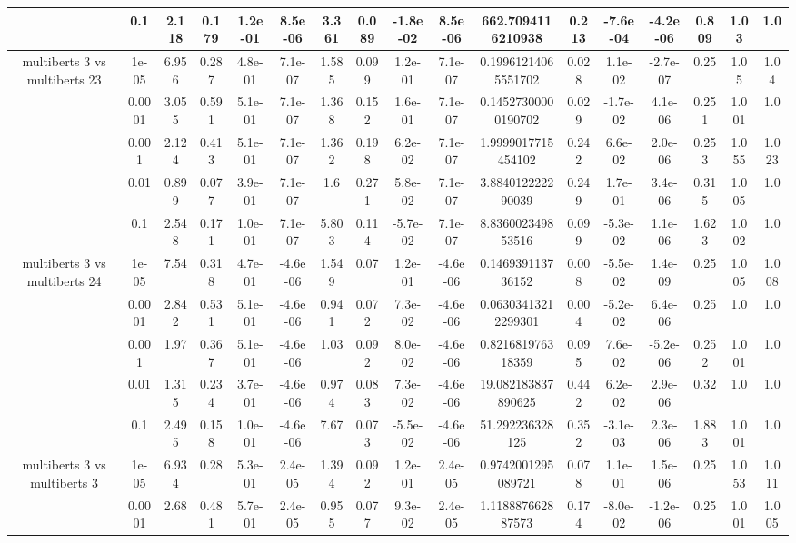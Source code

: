 \begin{tabular}{|c|c|c|c|c|c|c|c|c|c|c|c|c|c|c|c|c|}
 & 0.1 & 2.118 & 0.179 & 1.2e-01 & 8.5e-06 & 3.361 & 0.089 & -1.8e-02 & 8.5e-06 & 662.7094116210938 & 0.213 & -7.6e-04 & -4.2e-06 & 0.809 & 1.03 & 1.0 \\
\hline
\multirow{5}{*}{multiberts 3 vs multiberts 23} & 1e-05 & 6.956 & 0.287 & 4.8e-01 & 7.1e-07 & 1.585 & 0.099 & 1.2e-01 & 7.1e-07 & 0.19961214065551702 & 0.028 & 1.1e-02 & -2.7e-07 & 0.25 & 1.05 & 1.04 \\
 & 0.0001 & 3.055 & 0.591 & 5.1e-01 & 7.1e-07 & 1.368 & 0.152 & 1.6e-01 & 7.1e-07 & 0.14527300000190702 & 0.029 & -1.7e-02 & 4.1e-06 & 0.251 & 1.001 & 1.0 \\
 & 0.001 & 2.124 & 0.413 & 5.1e-01 & 7.1e-07 & 1.362 & 0.198 & 6.2e-02 & 7.1e-07 & 1.9999017715454102 & 0.242 & 6.6e-02 & 2.0e-06 & 0.253 & 1.055 & 1.023 \\
 & 0.01 & 0.899 & 0.077 & 3.9e-01 & 7.1e-07 & 1.6 & 0.271 & 5.8e-02 & 7.1e-07 & 3.884012222290039 & 0.249 & 1.7e-01 & 3.4e-06 & 0.315 & 1.005 & 1.0 \\
 & 0.1 & 2.548 & 0.171 & 1.0e-01 & 7.1e-07 & 5.803 & 0.114 & -5.7e-02 & 7.1e-07 & 8.836002349853516 & 0.099 & -5.3e-02 & 1.1e-06 & 1.623 & 1.002 & 1.0 \\
\hline
\multirow{5}{*}{multiberts 3 vs multiberts 24} & 1e-05 & 7.54 & 0.318 & 4.7e-01 & -4.6e-06 & 1.549 & 0.07 & 1.2e-01 & -4.6e-06 & 0.146939113736152 & 0.008 & -5.5e-02 & 1.4e-09 & 0.25 & 1.005 & 1.008 \\
 & 0.0001 & 2.842 & 0.531 & 5.1e-01 & -4.6e-06 & 0.941 & 0.072 & 7.3e-02 & -4.6e-06 & 0.06303413212299301 & 0.004 & -5.2e-02 & 6.4e-06 & 0.25 & 1.0 & 1.0 \\
 & 0.001 & 1.97 & 0.367 & 5.1e-01 & -4.6e-06 & 1.03 & 0.092 & 8.0e-02 & -4.6e-06 & 0.821681976318359 & 0.095 & 7.6e-02 & -5.2e-06 & 0.252 & 1.001 & 1.0 \\
 & 0.01 & 1.315 & 0.234 & 3.7e-01 & -4.6e-06 & 0.974 & 0.083 & 7.3e-02 & -4.6e-06 & 19.082183837890625 & 0.442 & 6.2e-02 & 2.9e-06 & 0.32 & 1.0 & 1.0 \\
 & 0.1 & 2.495 & 0.158 & 1.0e-01 & -4.6e-06 & 7.67 & 0.073 & -5.5e-02 & -4.6e-06 & 51.292236328125 & 0.352 & -3.1e-03 & 2.3e-06 & 1.883 & 1.001 & 1.0 \\
\hline
\multirow{5}{*}{multiberts 3 vs multiberts 3} & 1e-05 & 6.934 & 0.28 & 5.3e-01 & 2.4e-05 & 1.394 & 0.092 & 1.2e-01 & 2.4e-05 & 0.9742001295089721 & 0.078 & 1.1e-01 & 1.5e-06 & 0.25 & 1.053 & 1.011 \\
 & 0.0001 & 2.68 & 0.481 & 5.7e-01 & 2.4e-05 & 0.955 & 0.077 & 9.3e-02 & 2.4e-05 & 1.118887662887573 & 0.174 & -8.0e-02 & -1.2e-06 & 0.25 & 1.001 & 1.005 \\

\end{tabular}
